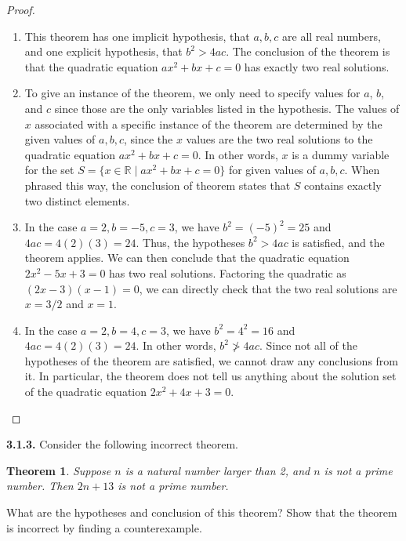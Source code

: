 \documentclass[12pt]{amsart}
\newenvironment{statement}[1]{\smallskip\noindent\color[rgb]{.6627, .3529, .6314} {\bf #1.}}{}
\newtheorem{theorem}{Theorem}
\theoremstyle{definition}
\theoremstyle{remark}
\newcommand{\BR}{\mathbb R}
\begin{document}
\begin{proof}
\hfill
\begin{enumerate}
	\item This theorem has one implicit hypothesis, that $a, b, c$ are all real numbers,
	and one explicit hypothesis, that $b^2 > 4ac$.
	The conclusion of the theorem is that the quadratic equation $ax^2 + bx + c = 0$
	has exactly two real solutions.
	
	\item To give an instance of the theorem, we only need to specify values for $a$, $b$, and $c$
	since those are the only variables listed in the hypothesis.
	The values of $x$ associated with a specific instance of the theorem are determined
	by the given values of $a, b, c$, since the $x$ values are the two real solutions to the
	quadratic equation $ax^2 + bx + c = 0$.
	In other words, $x$ is a dummy variable for the set 
	$S = \{ x \in \BR \mid ax^2 + bx + c = 0 \}$ for given values of $a, b, c$.
	When phrased this way, the conclusion of theorem states that $S$ contains
	exactly two distinct elements.
	
	\item In the case $a = 2, b = -5, c = 3$, we have $b^2 = (-5)^2 = 25$ 
	and $4ac = 4(2)(3) = 24$.
	Thus, the hypotheses $b^2 > 4ac$ is satisfied, and the theorem applies.
	We can then conclude that the quadratic equation $2x^2 - 5x + 3 = 0$ has two real solutions.
	Factoring the quadratic as $(2x - 3)(x - 1) = 0$, we can directly check that the two
	real solutions are $x = 3/2$ and $x = 1$.
	
	\item In the case $a = 2, b = 4, c = 3$, we have $b^2 = 4^2 = 16$
	and $4ac = 4(2)(3) = 24$.
	In other words, $b^2 \ngtr 4ac$.
	Since not all of the hypotheses of the theorem are satisfied,
	we cannot draw any conclusions from it.
	In particular, the theorem does not tell us anything about the solution set of
	the quadratic equation $2x^2 + 4x + 3 = 0$.
\end{enumerate}
\end{proof}


\begin{statement}{3.1.3}
Consider the following incorrect theorem.
\begin{theorem}
	Suppose $n$ is a natural number larger than 2, and $n$ is not a prime number.
	Then $2n + 13$ is not a prime number.
\end{theorem}
What are the hypotheses and conclusion of this theorem?
Show that the theorem is incorrect by finding a counterexample.
\end{statement}
\end{document}
